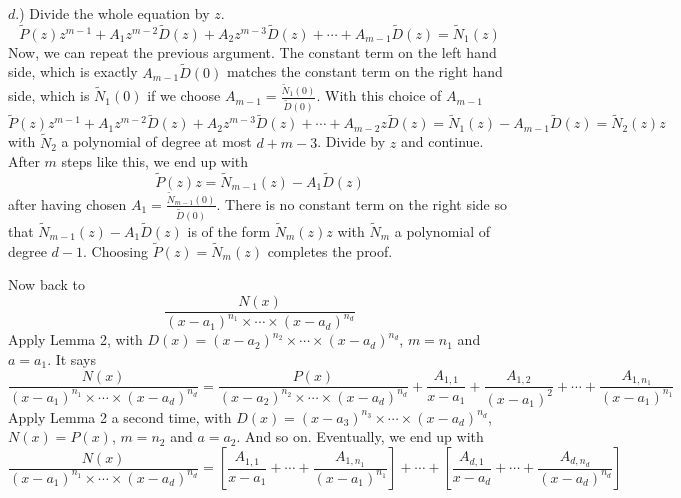\(d\).) Divide the whole equation by \(z\).
\[
\tilde{P}(z)z^{m-1} + A_1 z^{m-2} \tilde{D}(z) + A_2 z^{m-3} \tilde{D}(z) + \cdots + A_{m-1} \tilde{D}(z) = \tilde{N}_1(z)
\]
Now, we can repeat the previous argument. The constant term on the left hand side, which
is exactly \(A_{m-1} \tilde{D}(0)\) matches the constant term on the right hand side, which is \(\tilde{N}_1(0)\) if we
choose \(A_{m-1} = \frac{\tilde{N}_1(0)}{\tilde{D}(0)}\). With this choice of \(A_{m-1}\)
\[
\tilde{P}(z)z^{m-1} + A_1 z^{m-2} \tilde{D}(z) + A_2 z^{m-3} \tilde{D}(z) + \cdots + A_{m-2} z \tilde{D}(z) = \tilde{N}_1(z) - A_{m-1} \tilde{D}(z) = \tilde{N}_2(z)z
\]
with \(\tilde{N}_2\) a polynomial of degree at most \(d + m - 3\). Divide by \(z\) and continue. After \(m\) steps
like this, we end up with
\[
\tilde{P}(z)z = \tilde{N}_{m-1}(z) - A_1 \tilde{D}(z)
\]
after having chosen \(A_1 = \frac{\tilde{N}_{m-1}(0)}{\tilde{D}(0)}\). There is no constant term on the right side so that
\(\tilde{N}_{m-1}(z) - A_1 \tilde{D}(z)\) is of the form \(\tilde{N}_m(z)z\) with \(\tilde{N}_m\) a polynomial of degree \(d - 1\). Choosing
\(\tilde{P}(z) = \tilde{N}_m(z)\) completes the proof.

Now back to
\[
\frac{N(x)}{(x-a_1)^{n_1} \times \cdots \times (x-a_d)^{n_d}}
\]
Apply Lemma 2, with \(D(x) = (x - a_2)^{n_2} \times \cdots \times (x - a_d)^{n_d}\), \(m = n_1\) and \(a = a_1\). It says
\[
\frac{N(x)}{(x-a_1)^{n_1} \times \cdots \times (x-a_d)^{n_d}} = \frac{P(x)}{(x-a_2)^{n_2} \times \cdots \times (x-a_d)^{n_d}} + \frac{A_{1,1}}{x-a_1} + \frac{A_{1,2}}{(x-a_1)^2} + \cdots + \frac{A_{1,n_1}}{(x-a_1)^{n_1}}
\]
Apply Lemma 2 a second time, with \(D(x) = (x - a_3)^{n_3} \times \cdots \times (x - a_d)^{n_d}\), \(N(x) = P(x)\),
\(m = n_2\) and \(a = a_2\). And so on. Eventually, we end up with
\[
\frac{N(x)}{(x-a_1)^{n_1} \times \cdots \times (x-a_d)^{n_d}} = \left[ \frac{A_{1,1}}{x-a_1} + \cdots + \frac{A_{1,n_1}}{(x-a_1)^{n_1}} \right] + \cdots + \left[ \frac{A_{d,1}}{x-a_d} + \cdots + \frac{A_{d,n_d}}{(x-a_d)^{n_d}} \right]
\]

\newpage